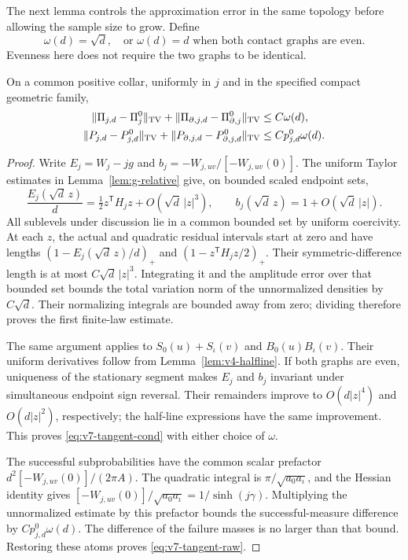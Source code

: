 The next lemma controls the approximation error in the same topology
before allowing the sample size to grow. Define
\[
 \omega(d)=\sqrt d,
 \quad\text{or }\omega(d)=d\text{ when both contact graphs are even.}
\]
Evenness here does not require the two graphs to be identical.

\begin{lemma}\label{lem:v7-tangent}
On a common positive collar, uniformly in $j$ and in the specified
compact geometric family,
\begin{align}
 \|\Pi_{j,d}-\Pi_j^0\|_{\rm TV}
  +\|\Pi_{\partial,j,d}-\Pi_{\partial,j}^0\|_{\rm TV}
      &\le C\omega(d),\label{eq:v7-tangent-cond}\\
 \|P_{j,d}-P_{j,d}^0\|_{\rm TV}
  +\|P_{\partial,j,d}-P_{\partial,j,d}^0\|_{\rm TV}
      &\le C p_{j,d}^0\omega(d).\label{eq:v7-tangent-raw}
\end{align}
\end{lemma}
\begin{proof}
Write $E_j=W_j-jg$ and $b_j=-W_{j,uv}/[-W_{j,uv}(0)]$.
The uniform Taylor estimates in Lemma~\ref{lem:g-relative} give, on
bounded scaled endpoint sets,
\[
 \frac{E_j(\sqrt d\,z)}d=\tfrac12z^{\mathsf T}H_jz
                                    +O(\sqrt d\,|z|^3),\qquad
 b_j(\sqrt d\,z)=1+O(\sqrt d\,|z|).
\]
All sublevels under discussion lie in a common bounded set by uniform
coercivity. At each $z$, the actual and quadratic residual intervals
start at zero and have lengths $(1-E_j(\sqrt d\,z)/d)_+$ and
$(1-z^{\mathsf T}H_jz/2)_+$. Their symmetric-difference length is at
most $C\sqrt d\,|z|^3$. Integrating it and the amplitude error over
that bounded set bounds the total variation norm of the unnormalized
densities by $C\sqrt d$. Their normalizing integrals are bounded away
from zero; dividing therefore proves the first finite-law estimate.

The same argument applies to $S_0(u)+S_\iota(v)$ and $B_0(u)B_\iota(v)$.
Their uniform derivatives follow from Lemma~\ref{lem:v4-halfline}.
If both graphs are even, uniqueness of the stationary segment makes
$E_j$ and $b_j$ invariant under simultaneous endpoint sign reversal.
Their remainders improve to $O(d|z|^4)$ and $O(d|z|^2)$, respectively;
the half-line expressions have the same improvement. This proves
\eqref{eq:v7-tangent-cond} with either choice of $\omega$.

The successful subprobabilities have the common scalar prefactor
$d^2[-W_{j,uv}(0)]/(2\pi A)$. The quadratic integral is
$\pi/\sqrt{a_0a_\iota}$, and the Hessian identity gives
$[-W_{j,uv}(0)]/\sqrt{a_0a_\iota}=1/\sinh(j\gamma)$.
Multiplying the unnormalized estimate by this prefactor bounds the
successful-measure difference by $Cp_{j,d}^0\omega(d)$.
The difference of the failure masses is no larger than that bound.
Restoring these atoms proves \eqref{eq:v7-tangent-raw}.
\end{proof}

